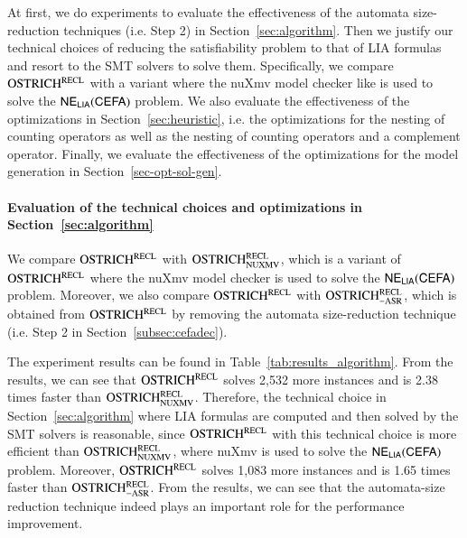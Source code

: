 At first, we do experiments to evaluate the effectiveness of the automata size-reduction techniques (i.e. Step 2) in Section~\ref{sec:algorithm}. Then we justify our technical choices of reducing the satisfiability problem to that of LIA formulas and resort to the SMT solvers to solve them. Specifically, we compare $\rm OSTRICH^{RECL}$ with a variant where the nuXmv model checker like \cite{atva2020} is used to solve the ${\sf NE_{LIA}(CEFA)}$ problem. 
%
We also evaluate the effectiveness of the optimizations in Section~\ref{sec:heuristic}, i.e. the optimizations for the nesting of counting operators as well as the nesting of counting operators and a complement operator. Finally, we evaluate the effectiveness of the optimizations for the model generation in Section~\ref{sec-opt-sol-gen}. 


\paragraph*{Evaluation of the technical choices and optimizations in Section~\ref{sec:algorithm}}
%
We compare $\rm OSTRICH^{RECL}$ with $\rm OSTRICH^{RECL}_{\rm NUXMV}$, which is a variant of $\rm OSTRICH^{RECL}$ where the nuXmv model checker is used to solve the ${\sf NE_{LIA}(CEFA)}$ problem. Moreover, we also compare $\rm OSTRICH^{RECL}$ with $\rm OSTRICH^{RECL}_{\rm -ASR}$, which is obtained from $\rm OSTRICH^{RECL}$ by removing the automata size-reduction technique (i.e. Step 2 in Section~\ref{subsec:cefadec}). 

The experiment results can be found in Table~\ref{tab:results_algorithm}. From the results, we can see that $\rm OSTRICH^{RECL}$ solves 2,532 more instances and is 2.38 times faster than $\rm OSTRICH^{RECL}_{\rm NUXMV}$. 
Therefore, the technical choice in Section~\ref{sec:algorithm} where LIA formulas are computed and then solved by the SMT solvers is reasonable, since $\rm OSTRICH^{RECL}$ with this technical choice is more efficient than $\rm OSTRICH^{RECL}_{\rm NUXMV}$, where nuXmv is used to solve the ${\sf NE_{LIA}(CEFA)}$ problem. 
%
Moreover, $\rm OSTRICH^{RECL}$ solves 1,083 more instances and is 1.65 times faster than $\rm OSTRICH^{RECL}_{\rm -ASR}$. 
From the results, we can see that the automata-size reduction technique indeed plays an important role for the performance improvement. 

